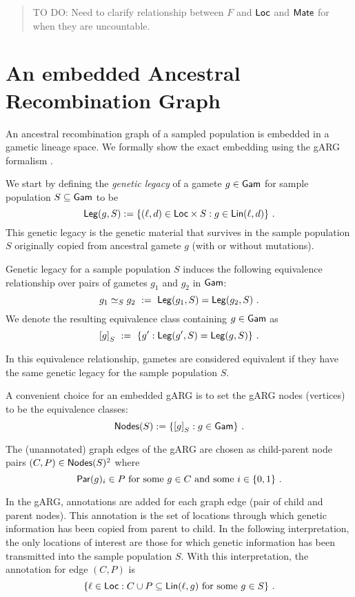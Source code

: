 \documentclass{article}
\begin{document}
\begin{quote}
TO DO: Need to clarify relationship between \(F\) and \(\mathsf{Loc}\) and
\(\mathsf{Mate}\) for when they are uncountable.
\end{quote}

\section{An embedded Ancestral Recombination Graph}

An ancestral recombination graph \cite{friedman_ancestral_1997}
\cite{hein_gene_2005} \cite{wakeley_coalescent_2009} of a sampled
population is embedded in a gametic lineage space. We formally show the
exact embedding using the gARG formalism \cite{wong_what_arg_2022}.

We start by defining the \emph{genetic legacy} of a gamete
\(g \in \mathsf{Gam}\) for sample population \(S \subseteq \mathsf{Gam}\) to be \[
  \mathsf{Leg}(g, S) := \{ (\ell, d) \in \mathsf{Loc} \times S : g \in \mathsf{Lin}(\ell, d) \}
\text{ .}
\] This genetic legacy is the genetic material that survives in the
sample population \(S\) originally copied from ancestral gamete \(g\)
(with or without mutations).

Genetic legacy for a sample population \(S\) induces the following
equivalence relationship over pairs of gametes \(g_1\) and \(g_2\) in
\(\mathsf{Gam}\): \[
g_1 \simeq_S g_2 \ := \ \mathsf{Leg}(g_1, S) = \mathsf{Leg}(g_2, S)
\text{ .}
\] We denote the resulting equivalence class containing \(g \in \mathsf{Gam}\)
as \[
{[g]}_S \ := \ \{ g' : \mathsf{Leg}(g', S) = \mathsf{Leg}(g, S) \}
\text{ .}
\]

In this equivalence relationship, gametes are considered equivalent if
they have the same genetic legacy for the sample population \(S\).

A convenient choice for an embedded gARG \cite{wong_what_arg_2022} is
to set the gARG nodes (vertices) to be the equivalence classes: \[
   \mathsf{Nodes}(S) := \{ {[g]}_S : g \in \mathsf{Gam} \}
\text{ .}
\]

The (unannotated) graph edges of the gARG are chosen as child-parent
node pairs \((C, P) \in \mathsf{Nodes}(S)^2\) where \[
  \mathsf{Par}(g)_i \in P \text{ for some $g \in C$ and some $i \in \{0, 1\}$ .}
\]

In the gARG, annotations are added for each graph edge (pair of child
and parent nodes). This annotation is the set of locations through which
genetic information has been copied from parent to child. In the
following interpretation, the only locations of interest are those for
which genetic information has been transmitted into the sample
population \(S\). With this interpretation, the annotation for edge
\((C,P)\) is \[
  \{ \ell \in \mathsf{Loc} :
     C \cup P \subseteq \mathsf{Lin}(\ell, g) \text{ for some $g \in S$}
  \}
\text{ .}
\]
\end{document}
